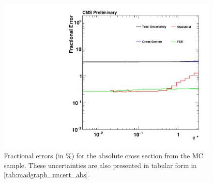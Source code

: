 \begin{figure}[!p]
    \centering
    \includegraphics[width=\textwidth]{figures/madgraph_uncertainty_absolute.pdf}
    \caption[
        Fractional errors for the absolute cross section from the
        \MADGRAPH MC sample.
    ]{
        Fractional errors (in \%) for the absolute cross section from the
        \MADGRAPH MC sample. These uncertainties are also presented in tabular
        form in \cref{tab:madgraph_uncert_abs}.
    }
    \label{fig:madgraph_uncert_abs}
\end{figure}
